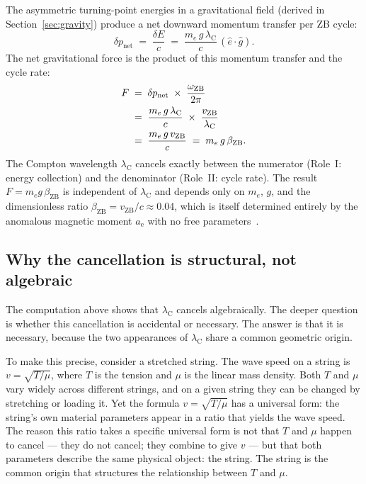 \documentclass[%
 reprint, amsmath,amssymb, aps, prb, ]{revtex4-2}
\numberwithin{equation}{section}
\newcommand{\omZB}{\omega_{\text{ZB}}}
\newcommand{\lambdaC}{\lambda_{\mathrm{C}}}
\newcommand{\betaZB}{\beta_{\mathrm{ZB}}}
\newcommand{\vZB}{v_{\mathrm{ZB}}}
\newcommand{\anom}{a_{\mathrm{e}}}
\begin{document}
The asymmetric turning-point energies in a gravitational field (derived in Section~\ref{sec:gravity}) produce a net downward momentum transfer per ZB cycle:
\begin{equation}
\delta p_\mathrm{net} \;=\; \frac{\delta E}{c} \;=\; \frac{m_e\,g\,\lambdaC}{c}\,(\hat{e}\cdot\hat{g}).
\label{eq:dp_net}
\end{equation}
The net gravitational force is the product of this momentum transfer and the cycle rate:
\begin{align}
F
&\;=\; \delta p_\mathrm{net} \;\times\; \frac{\omZB}{2\pi}
\notag\\
&\;=\; \frac{m_e\,g\,\lambdaC}{c} \;\times\; \frac{\vZB}{\lambdaC}
\notag\\
&\;=\; \frac{m_e\,g\,\vZB}{c} \;=\; m_e\,g\,\betaZB.
\label{eq:F_cancel}
\end{align}
The Compton wavelength $\lambdaC$ cancels exactly between the numerator (Role~I: energy collection) and the denominator (Role~II: cycle rate).
The result $F = m_e g\,\betaZB$ is independent of $\lambdaC$ and depends only on $m_e$, $g$, and the dimensionless ratio $\betaZB = \vZB/c \approx 0.04$, which is itself determined entirely by the anomalous magnetic moment $\anom$ with no free parameters~\cite{hanamura10}.

\subsection{Why the cancellation is structural, not algebraic}
\label{subsec:structural}

The computation above shows that $\lambdaC$ cancels algebraically.
The deeper question is whether this cancellation is accidental or necessary.
The answer is that it is necessary, because the two appearances of $\lambdaC$ share a common geometric origin.

To make this precise, consider a stretched string.
The wave speed on a string is $v = \sqrt{T/\mu}$, where $T$ is the tension and $\mu$ is the linear mass density.
Both $T$ and $\mu$ vary widely across different strings, and on a given string they can be changed by stretching or loading it.
Yet the formula $v = \sqrt{T/\mu}$ has a universal form: the string's own material parameters appear in a ratio that yields the wave speed.
The reason this ratio takes a specific universal form is not that $T$ and $\mu$ happen to cancel --- they do not cancel; they combine to give $v$ --- but that both parameters describe the same physical object: the string.
The string is the common origin that structures the relationship between $T$ and $\mu$.
\end{document}
